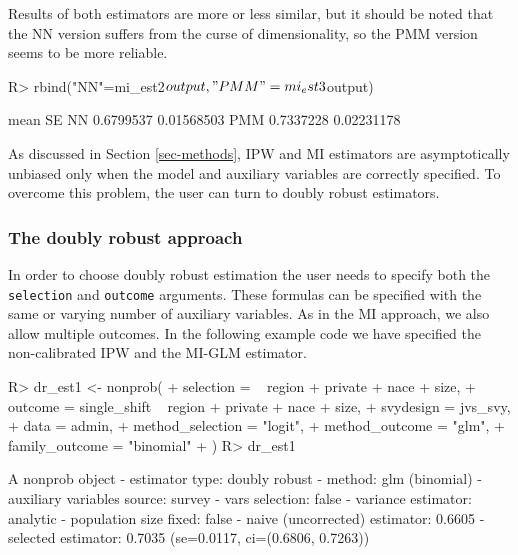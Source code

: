 \documentclass[
]{jss}
\begin{document}
Results of both estimators are more or less similar, but it should be
noted that the NN version suffers from the curse of dimensionality, so
the PMM version seems to be more reliable.

\begin{CodeChunk}
\begin{CodeInput}
R> rbind("NN"=mi_est2$output, "PMM"=mi_est3$output)
\end{CodeInput}
\begin{CodeOutput}
         mean         SE
NN  0.6799537 0.01568503
PMM 0.7337228 0.02231178
\end{CodeOutput}
\end{CodeChunk}

As discussed in Section \ref{sec-methods}, IPW and MI estimators are
asymptotically unbiased only when the model and auxiliary variables are
correctly specified. To overcome this problem, the user can turn to
doubly robust estimators.

\subsubsection{The doubly robust
approach}\label{the-doubly-robust-approach}

In order to choose doubly robust estimation the user needs to specify
both the \texttt{selection} and \texttt{outcome} arguments. These
formulas can be specified with the same or varying number of auxiliary
variables. As in the MI approach, we also allow multiple outcomes. In
the following example code we have specified the non-calibrated IPW and
the MI-GLM estimator.

\begin{CodeChunk}
\begin{CodeInput}
R> dr_est1 <- nonprob(
+   selection = ~ region + private + nace + size,
+   outcome = single_shift ~ region + private + nace + size,
+   svydesign = jvs_svy,
+   data = admin,
+   method_selection = "logit",
+   method_outcome = "glm",
+   family_outcome = "binomial"
+ )
R> dr_est1
\end{CodeInput}
\begin{CodeOutput}
A nonprob object
 - estimator type: doubly robust
 - method: glm (binomial)
 - auxiliary variables source: survey
 - vars selection: false
 - variance estimator: analytic
 - population size fixed: false
 - naive (uncorrected) estimator: 0.6605
 - selected estimator: 0.7035 (se=0.0117, ci=(0.6806, 0.7263))
\end{CodeOutput}
\end{CodeChunk}
\end{document}
